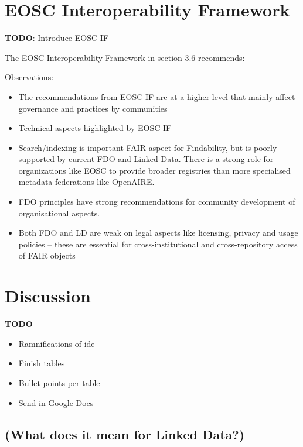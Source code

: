 \documentclass[fleqn,10pt,lineno]{wlpeerj}
\providecommand{\tightlist}{%
  \setlength{\itemsep}{0pt}\setlength{\parskip}{0pt}}
\begin{document}
\hypertarget{eosc-interoperability-framework}{%
\section*{EOSC Interoperability Framework}\label{eosc-interoperability-framework}}

\textbf{TODO}: Introduce EOSC IF

The EOSC Interoperability Framework \cite{aCye3KpE} in section 3.6 recommends:



Observations:

\begin{itemize}
\tightlist
\item
  The recommendations from EOSC IF are at a higher level that mainly affect governance and practices by communities
\item
  Technical aspects highlighted by EOSC IF
\item
  Search/indexing is important FAIR aspect for Findability, but is poorly supported by current FDO and Linked Data. There is a strong role for organizations like EOSC to provide broader registries than more specialised metadata federations like OpenAIRE.
\item
  FDO principles have strong recommendations for community development of organisational aspects.
\item
  Both FDO and LD are weak on legal aspects like licensing, privacy and usage policies -- these are essential for cross-institutional and cross-repository access of FAIR objects
\end{itemize}

\hypertarget{sec:discussion}{%
\section*{Discussion}\label{sec:discussion}}

\textbf{TODO}

\begin{itemize}
\tightlist
\item
  Ramnifications of ide
\item
  Finish tables
\item
  Bullet points per table
\item
  Send in Google Docs
\end{itemize}

\hypertarget{what-does-it-mean-for-linked-data}{%
\subsection*{(What does it mean for Linked Data?)}\label{what-does-it-mean-for-linked-data}}
\end{document}
